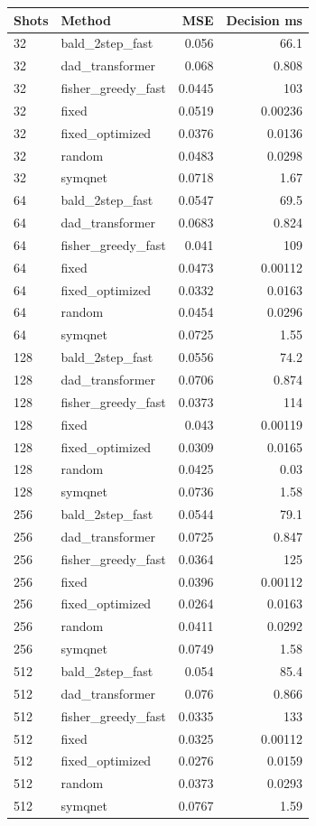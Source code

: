 \begin{tabular}{llrr}
\toprule
Shots & Method & MSE & Decision ms \\
\midrule
32 & bald\_2step\_fast & 0.056 & 66.1 \\
32 & dad\_transformer & 0.068 & 0.808 \\
32 & fisher\_greedy\_fast & 0.0445 & 103 \\
32 & fixed & 0.0519 & 0.00236 \\
32 & fixed\_optimized & 0.0376 & 0.0136 \\
32 & random & 0.0483 & 0.0298 \\
32 & symqnet & 0.0718 & 1.67 \\
64 & bald\_2step\_fast & 0.0547 & 69.5 \\
64 & dad\_transformer & 0.0683 & 0.824 \\
64 & fisher\_greedy\_fast & 0.041 & 109 \\
64 & fixed & 0.0473 & 0.00112 \\
64 & fixed\_optimized & 0.0332 & 0.0163 \\
64 & random & 0.0454 & 0.0296 \\
64 & symqnet & 0.0725 & 1.55 \\
128 & bald\_2step\_fast & 0.0556 & 74.2 \\
128 & dad\_transformer & 0.0706 & 0.874 \\
128 & fisher\_greedy\_fast & 0.0373 & 114 \\
128 & fixed & 0.043 & 0.00119 \\
128 & fixed\_optimized & 0.0309 & 0.0165 \\
128 & random & 0.0425 & 0.03 \\
128 & symqnet & 0.0736 & 1.58 \\
256 & bald\_2step\_fast & 0.0544 & 79.1 \\
256 & dad\_transformer & 0.0725 & 0.847 \\
256 & fisher\_greedy\_fast & 0.0364 & 125 \\
256 & fixed & 0.0396 & 0.00112 \\
256 & fixed\_optimized & 0.0264 & 0.0163 \\
256 & random & 0.0411 & 0.0292 \\
256 & symqnet & 0.0749 & 1.58 \\
512 & bald\_2step\_fast & 0.054 & 85.4 \\
512 & dad\_transformer & 0.076 & 0.866 \\
512 & fisher\_greedy\_fast & 0.0335 & 133 \\
512 & fixed & 0.0325 & 0.00112 \\
512 & fixed\_optimized & 0.0276 & 0.0159 \\
512 & random & 0.0373 & 0.0293 \\
512 & symqnet & 0.0767 & 1.59 \\
\bottomrule
\end{tabular}
